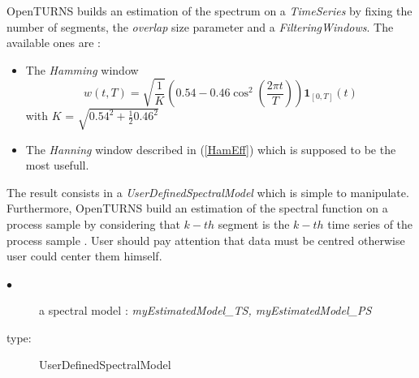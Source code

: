 OpenTURNS builds an estimation of the spectrum on a \textit{TimeSeries} by fixing the number of segments, the \textit{overlap} size parameter and a \textit{FilteringWindows}. The available ones are :
\begin{itemize}
\item The \textit{Hamming} window
  \begin{equation}
    w(t, T) = \sqrt{\frac{1}{K}}\left(0.54-0.46\cos^2\left(\frac{2 \pi t}{T}\right)\right)\mathbf{1}_{[0,T]}(t)
  \end{equation}
  with $K$ = $\sqrt{0.54^2 + \frac{1}{2} 0.46^2}$
\item The \textit{Hanning} window described in (\ref{HamEff}) which is supposed to be the most usefull.
\end{itemize}
The result consists in a \textit{UserDefinedSpectralModel} which is simple to manipulate. \\

Furthermore, OpenTURNS build an estimation of the spectral function on a process sample by considering that $k-th$ segment is the $k-th$ time series  of the process sample .
User should pay attention that data must be centred otherwise user could center them himself. \\


{

  \begin{description}
  \item[$\bullet$] a spectral model : {\itshape myEstimatedModel\_TS, myEstimatedModel\_PS}
  \item[type:]  UserDefinedSpectralModel
  \end{description}

}

